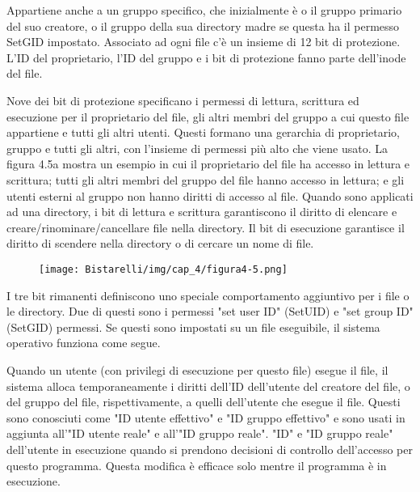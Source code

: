 \singlespacing

Appartiene anche a un gruppo specifico, che inizialmente è o il gruppo primario del suo creatore, o il gruppo della sua directory madre se questa ha il permesso SetGID impostato. Associato ad ogni file c'è un insieme di 12 bit di protezione. L'ID del proprietario, l'ID del gruppo e i bit di protezione fanno parte dell'inode del file.

\singlespacing

Nove dei bit di protezione specificano i permessi di lettura, scrittura ed esecuzione per il proprietario del file, gli altri membri del gruppo a cui questo file appartiene e tutti gli altri utenti. Questi formano una gerarchia di proprietario, gruppo e tutti gli altri, con l'insieme di permessi più alto che viene usato. La figura 4.5a mostra un esempio in cui il proprietario del file ha accesso in lettura e scrittura; tutti gli altri membri del gruppo del file hanno accesso in lettura; e gli utenti esterni al gruppo non hanno diritti di accesso al file. Quando sono applicati ad una directory, i bit di lettura e scrittura garantiscono il diritto di elencare e creare/rinominare/cancellare file nella directory. Il bit di esecuzione garantisce il diritto di scendere nella directory o di cercare un nome di file.

\begin{figure}[H]
	\centering
    \texttt{[image: Bistarelli/img/cap\_4/figura4-5.png]}
\end{figure}

I tre bit rimanenti definiscono uno speciale comportamento aggiuntivo per i file o le directory. Due di questi sono i permessi "set user ID" (SetUID) e "set group ID" (SetGID) permessi. Se questi sono impostati su un file eseguibile, il sistema operativo funziona come segue.

\singlespacing

Quando un utente (con privilegi di esecuzione per questo file) esegue il file, il sistema alloca temporaneamente i diritti dell'ID dell'utente del creatore del file, o del gruppo del file, rispettivamente, a quelli dell'utente che esegue il file. Questi sono conosciuti come "ID utente effettivo" e "ID gruppo effettivo" e sono usati in aggiunta all'"ID utente reale" e all'"ID gruppo reale". "ID" e "ID gruppo reale" dell'utente in esecuzione quando si prendono decisioni di controllo dell'accesso per questo programma. Questa modifica è efficace solo mentre il programma è in esecuzione.

